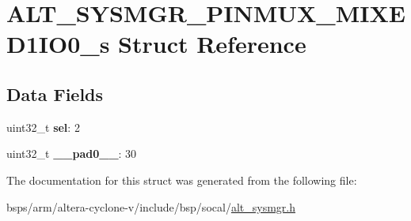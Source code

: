 \hypertarget{structALT__SYSMGR__PINMUX__MIXED1IO0__s}{}\section{A\+L\+T\+\_\+\+S\+Y\+S\+M\+G\+R\+\_\+\+P\+I\+N\+M\+U\+X\+\_\+\+M\+I\+X\+E\+D1\+I\+O0\+\_\+s Struct Reference}
\label{structALT__SYSMGR__PINMUX__MIXED1IO0__s}
\subsection*{Data Fields}
\begin{DoxyCompactItemize}
\item 
\mbox{\label{structALT__SYSMGR__PINMUX__MIXED1IO0__s_a955147f398f986ce5ddad4eeb4976909}} 
uint32\+\_\+t {\bfseries sel}\+: 2
\item 
\mbox{\label{structALT__SYSMGR__PINMUX__MIXED1IO0__s_a487a65ffedb3209c2d2ab1706888db2f}} 
uint32\+\_\+t {\bfseries \+\_\+\+\_\+pad0\+\_\+\+\_\+}\+: 30
\end{DoxyCompactItemize}


The documentation for this struct was generated from the following file\+:\begin{DoxyCompactItemize}
\item 
bsps/arm/altera-\/cyclone-\/v/include/bsp/socal/\mbox{\hyperlink{alt__sysmgr_8h}{alt\+\_\+sysmgr.\+h}}\end{DoxyCompactItemize}

